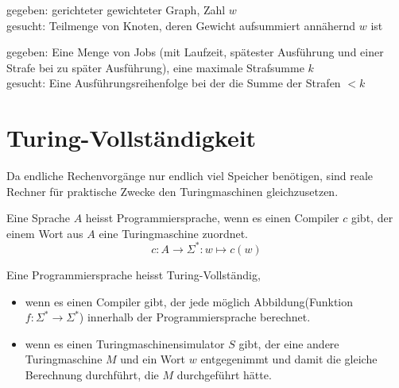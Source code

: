 \documentclass[a4paper]{article}
\begin{document}
\begin{multicols}{2}
	\begin{fspec}	
	gegeben: gerichteter gewichteter Graph, Zahl $w$ \\
	gesucht: Teilmenge von Knoten, deren Gewicht aufsummiert annähernd $w$ ist
	\end{fspec}	
			
	\begin{fspec}[Sequencing]	
	gegeben: Eine Menge von Jobs (mit Laufzeit, spätester Ausführung und einer Strafe
	bei zu später Ausführung), eine maximale Strafsumme $k$ \\
	gesucht: Eine Ausführungsreihenfolge bei der die Summe der Strafen $<k$
	\end{fspec}	
	
	\end{multicols}

\section{Turing-Vollständigkeit}
	\begin{multicols}{2}
	\begin{fmerke}[Realvergleich]
	Da endliche Rechenvorgänge nur endlich viel Speicher benötigen, sind reale Rechner für praktische Zwecke den Turingmaschinen gleichzusetzen.
	\end{fmerke}

	\begin{fdef}[Programmiersprache]
	Eine Sprache $A$ heisst Programmiersprache, wenn es einen Compiler $c$ gibt, der einem Wort aus $A$ eine Turingmaschine zuordnet.
	$$c: A \rightarrow \Sigma^*: w \mapsto c(w)$$
	\end{fdef}
	\end{multicols}

	\begin{fsatz}
	Eine Programmiersprache heisst Turing-Vollständig, 
	\begin{itemize}
		\item wenn es einen Compiler gibt, der jede möglich Abbildung(Funktion $f: \Sigma^* \rightarrow \Sigma^*$) innerhalb der Programmiersprache berechnet.
		\item wenn es einen Turingmaschinensimulator $S$ gibt, der eine andere Turingmaschine $M$ und ein Wort $w$ entgegenimmt und damit die gleiche Berechnung durchführt, die $M$ durchgeführt hätte.
	\end{itemize} 
	\end{fsatz}
	
\end{document}
